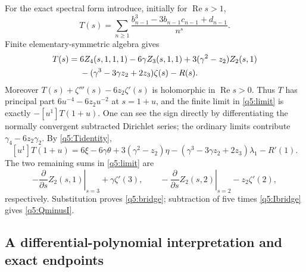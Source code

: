 For the exact spectral form introduce, initially for
$\operatorname{Re}s>1$,
\[
 T(s)=\sum_{n\geq1}
       \frac{b_{n-1}^3-3b_{n-1}c_{n-1}+d_{n-1}}{n^s}.
\]
Finite elementary-symmetric algebra gives
\begin{align}\label{q5:Tidentity}
 T(s)={}&6Z_4(s,1,1,1)-6\gamma Z_3(s,1,1)
           +3(\gamma^2-z_2)Z_2(s,1)\notag\\
 &-(\gamma^3-3\gamma z_2+2z_3)\zeta(s)-R(s).
\end{align}
Moreover $T(s)+\zeta'''(s)-6z_2\zeta'(s)$ is holomorphic in
$\operatorname{Re}s>0$.  Thus $T$ has principal part
$6u^{-4}-6z_2u^{-2}$ at $s=1+u$, and the finite limit in
\eqref{q5:limit} is exactly $-[u^1]T(1+u)$.
One can see the sign directly by differentiating the normally convergent
subtracted Dirichlet series; the ordinary limits contribute
$\gamma_4-6z_2\gamma_2$.
By \eqref{q5:Tidentity},
\[
 [u^1]T(1+u)=6\xi-6\gamma\theta+3(\gamma^2-z_2)\eta
       -(\gamma^3-3\gamma z_2+2z_3)\lambda_1-R'(1).
\]
The two remaining sums in \eqref{q5:limit} are
\[
 -\left.\frac{\partial}{\partial s}Z_2(s,1)\right|_{s=3}
          +\gamma\zeta'(3),\qquad
 -\left.\frac{\partial}{\partial s}Z_2(s,2)\right|_{s=2}
          -z_2\zeta'(2),
\]
respectively.  Substitution proves \eqref{q5:bridge}; subtraction
of five times \eqref{q5:Ibridge} gives \eqref{q5:QminusI}.

\subsection{A differential-polynomial interpretation and exact endpoints}

